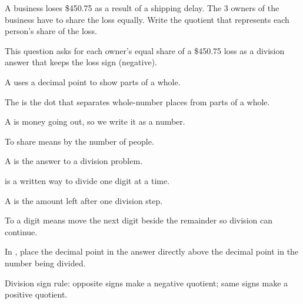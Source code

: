 


A business loses \$450.75 as a result of a shipping delay. The 3 owners of the
business have to share the loss equally. Write the quotient that represents each
person's share of the loss.


This question asks for each owner's equal share of a \$450.75 loss as a division
answer that keeps the loss sign (negative).

\begin{words}
  \item A uses a decimal point to show parts of a whole.
  \item The is the dot that separates whole-number places from parts of a whole.
  \item A is money going out, so we write it as a number.
  \item To share means by the number of people.
  \item A is the answer to a division problem.
  \item {}is a written way to divide one digit at a time.
  \item A is the amount left after one division step.
  \item To a digit means move the next digit beside the remainder so division can continue.
  \item In \unskip, place the decimal point in the answer directly above the decimal point in the number being divided.
  \item Division sign rule: opposite signs make a negative quotient; same signs make a positive quotient.
\end{words}

